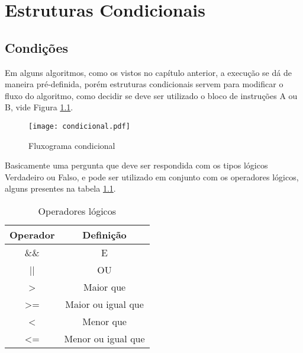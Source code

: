\chapter{Estruturas Condicionais}
\section{Condições}
Em alguns algoritmos, como os vistos no capítulo anterior, a execução se dá de maneira pré-definida, porém estruturas condicionais servem para modificar o fluxo do algoritmo, como decidir se deve ser utilizado o bloco de instruções A ou B, vide Figura \ref{fig:fluxo}.
\begin{figure}[!h]
    \centering
    \texttt{[image: condicional.pdf]}
    \caption{Fluxograma condicional}
    \label{fig:fluxo}
\end{figure}
Basicamente uma pergunta que deve ser respondida com os tipos lógicos Verdadeiro ou Falso, e pode ser utilizado em conjunto com os operadores lógicos, alguns presentes na tabela \ref{tab:operadoresLogicos}.
\begin{table}[!h]
\centering
\caption{Operadores lógicos}
\label{tab:operadoresLogicos}
\begin{tabular}{cc} \hline \hline
Operador      & Definição          \\ \hline
\&\&          & E                  \\
||            & OU                 \\
\textgreater  & Maior que          \\
\textgreater= & Maior ou igual que \\
\textless     & Menor que          \\
\textless=    & Menor ou igual que \\ \hline \hline

\end{tabular}
\end{table}

